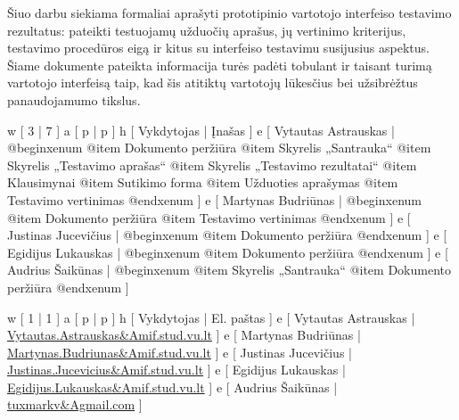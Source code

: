 
Šiuo darbu siekiama formaliai aprašyti prototipinio vartotojo interfeiso testavimo
rezultatus: pateikti testuojamų užduočių aprašus, jų vertinimo kriterijus, testavimo
procedūros eigą ir kitus su interfeiso testavimu susijusius aspektus. 
Šiame dokumente pateikta informacija turės padėti tobulant ir taisant turimą
vartotojo interfeisą taip, kad šis atitiktų vartotojų lūkesčius bei užsibrėžtus
panaudojamumo tikslus.

\xtable
{
  w [ 3  | 7 ]
  a [ p  | p ]
  h [ Vykdytojas | Įnašas ]
  e [ Vytautas Astrauskas
  | @begin{xenum} 
      @item Dokumento peržiūra
      @item Skyrelis „Santrauka“
      @item Skyrelis „Testavimo aprašas“
      @item Skyrelis „Testavimo rezultatai“
      @item Klausimynai
      @item Sutikimo forma
      @item Užduoties aprašymas
      @item Testavimo vertinimas
    @end{xenum}
  ]
  e [ Martynas Budriūnas
  | @begin{xenum} 
      @item Dokumento peržiūra
      @item Testavimo vertinimas
    @end{xenum}
  ]
  e [ Justinas Jucevičius 
  | @begin{xenum} 
      @item Dokumento peržiūra
    @end{xenum}
  ]
  e [ Egidijus Lukauskas 
  | @begin{xenum} 
      @item Dokumento peržiūra
    @end{xenum}
  ]
  e [ Audrius Šaikūnas 
  | @begin{xenum} 
      @item Skyrelis „Santrauka“
      @item Dokumento peržiūra
    @end{xenum}
  ]
}

\xtableu
{
  w [ 1 | 1 ]
  a [ p | p ]
  h [ Vykdytojas | El. paštas ]
  e [ Vytautas Astrauskas | \url{Vytautas.Astrauskas&Amif.stud.vu.lt} ]
  e [ Martynas Budriūnas  | \url{Martynas.Budriunas&Amif.stud.vu.lt} ]
  e [ Justinas Jucevičius | \url{Justinas.Jucevicius&Amif.stud.vu.lt} ]
  e [ Egidijus Lukauskas  | \url{Egidijus.Lukauskas&Amif.stud.vu.lt} ]
  e [ Audrius Šaikūnas    | \url{tuxmarkv&Agmail.com} ]
}
